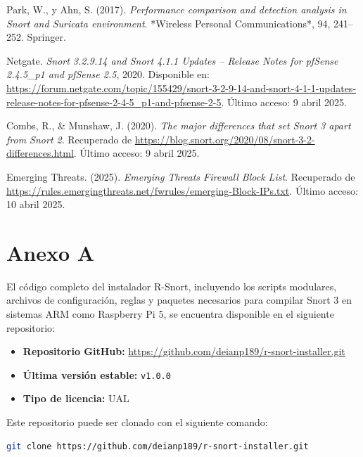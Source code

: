 \documentclass[12pt,a4paper]{report}
\begin{document}
\begin{thebibliography}{29}
	Park, W., y Ahn, S. (2017). \textit{Performance comparison and detection analysis in Snort and Suricata environment}. *Wireless Personal Communications*, 94, 241--252. Springer.
	
	Netgate. \textit{Snort 3.2.9.14 and Snort 4.1.1 Updates – Release Notes for pfSense 2.4.5\_p1 and pfSense 2.5}, 2020. Disponible en: \url{https://forum.netgate.com/topic/155429/snort-3-2-9-14-and-snort-4-1-1-updates-release-notes-for-pfsense-2-4-5_p1-and-pfsense-2-5}. Último acceso: 9 abril 2025.
	
	Combs, R., \& Munshaw, J. (2020). \textit{The major differences that set Snort 3 apart from Snort 2}. Recuperado de \url{https://blog.snort.org/2020/08/snort-3-2-differences.html}. Último acceso: 9 abril 2025.
	
	 Emerging Threats. (2025). \textit{Emerging Threats Firewall Block List}. Recuperado de \url{https://rules.emergingthreats.net/fwrules/emerging-Block-IPs.txt}. Último acceso: 10 abril 2025.
	
	
\end{thebibliography}

\appendix
\chapter{Anexo A}
\label{anexo_repositorio}

El código completo del instalador R-Snort, incluyendo los scripts modulares, archivos de configuración, reglas y paquetes necesarios para compilar Snort 3 en sistemas ARM como Raspberry Pi 5, se encuentra disponible en el siguiente repositorio:

\begin{itemize}
	\item \textbf{Repositorio GitHub:} \url{https://github.com/deianp189/r-snort-installer.git}
	\item \textbf{Última versión estable:} \texttt{v1.0.0}
	\item \textbf{Tipo de licencia:} UAL
\end{itemize}

Este repositorio puede ser clonado con el siguiente comando:

\begin{lstlisting}[language=bash]
	git clone https://github.com/deianp189/r-snort-installer.git
\end{lstlisting}
\end{document}
